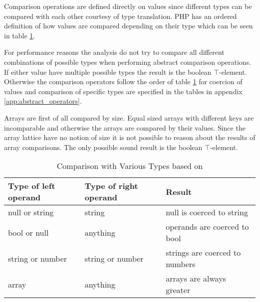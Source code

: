 Comparison operations are defined directly on values since different types can be compared with each other courtesy of type translation. PHP has an ordered definition of how values are compared depending on their type which can be seen in table \ref{tab:comparisons}.

For performance reasons the analysis do not try to compare all different combinations of possible types when performing abstract comparison operations. If either value have multiple possible types the result is the boolean $\top$-element. Otherwise the comparison operators follow the order of table \ref{tab:comparisons} for coercion of values and comparison of specific types are specified in the tables in appendix \ref{app:abstract_operators}.

Arrays are first of all compared by size. Equal sized arrays with different keys are incomparable and otherwise the arrays are compared by their values. Since the array lattice have no notion of size it is not possible to reason about the results of array comparisons. The only possible sound result is the boolean $\top$-element.


\begin{table}[htbp]
\centering
\begin{tabular}{l|l||l}
Type of left operand & Type of right operand & Result \\\hline\hline
null or string & string & null is coerced to string \\\hline
bool or null & anything & operands are coerced to bool \\\hline
string or number & string or number & strings are coerced to numbers \\\hline
array & anything & arrays are always greater
\end{tabular}
\caption{Comparison with Various Types based on \protect{}}
\label{tab:comparisons}
\end{table}
